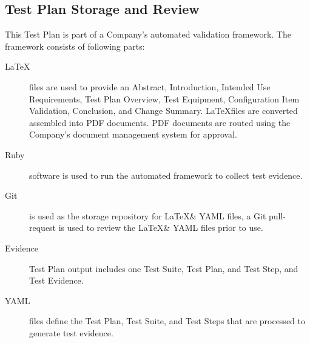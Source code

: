 \subsection{Test Plan Storage and Review}
This Test Plan is part of a Company's automated validation framework.  The
framework consists of following parts:
\begin{description}
  \item[\LaTeX] files are used to provide an Abstract, Introduction, Intended
    Use Requirements, Test Plan Overview, Test Equipment, Configuration
    Item Validation, Conclusion, and Change Summary.  \LaTeX files are converted
    assembled into PDF documents.  PDF documents are routed using the Company's
    document management system for approval.

  \item[Ruby] software is used to run the automated framework to collect test
    evidence.

  \item[Git] is used as the storage repository for \LaTeX \& YAML files, a Git
    pull-request is used to review the \LaTeX \& YAML files prior to use.

  \item[Evidence] Test Plan output includes one Test Suite, Test Plan, and Test
    Step, and Test Evidence.

  \item[YAML] files define the Test Plan, Test Suite, and Test Steps that are
    processed to generate test evidence.
\end{description}
